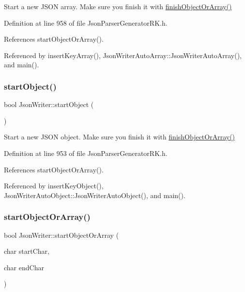 Start a new J\+S\+ON array. Make sure you finish it with \hyperlink{class_json_writer_adbd96b46b0679bea3a066c0e62bd86b0}{finish\+Object\+Or\+Array()} 



Definition at line 958 of file Json\+Parser\+Generator\+R\+K.\+h.



References start\+Object\+Or\+Array().



Referenced by insert\+Key\+Array(), Json\+Writer\+Auto\+Array\+::\+Json\+Writer\+Auto\+Array(), and main().

\mbox{\label{class_json_writer_a43d1a78bf211a2f12cfe9253462717ae}} 
\subsubsection{\texorpdfstring{start\+Object()}{startObject()}}
{\footnotesize\ttfamily bool Json\+Writer\+::start\+Object (\begin{DoxyParamCaption}{ }\end{DoxyParamCaption})\hspace{0.3cm}{\ttfamily [inline]}}



Start a new J\+S\+ON object. Make sure you finish it with \hyperlink{class_json_writer_adbd96b46b0679bea3a066c0e62bd86b0}{finish\+Object\+Or\+Array()} 



Definition at line 953 of file Json\+Parser\+Generator\+R\+K.\+h.



References start\+Object\+Or\+Array().



Referenced by insert\+Key\+Object(), Json\+Writer\+Auto\+Object\+::\+Json\+Writer\+Auto\+Object(), and main().

\mbox{\label{class_json_writer_a468e6c475bec83a7ec8cd7048cdbb31b}} 
\subsubsection{\texorpdfstring{start\+Object\+Or\+Array()}{startObjectOrArray()}}
{\footnotesize\ttfamily bool Json\+Writer\+::start\+Object\+Or\+Array (\begin{DoxyParamCaption}\item[{char}]{start\+Char,  }\item[{char}]{end\+Char }\end{DoxyParamCaption})}



